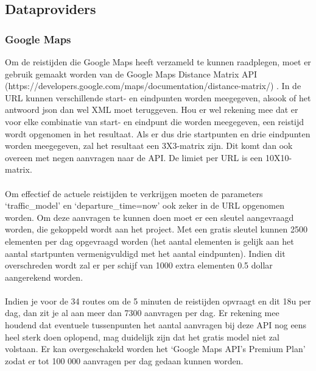 \documentclass[ps,a4paper,oneside]{report}
\begin{document}
\subsection{Dataproviders}
\subsubsection{Google Maps}
Om de reistijden die Google Maps heeft verzameld te kunnen raadplegen, moet er gebruik gemaakt worden van de Google Maps Distance Matrix API \\(https://developers.google.com/maps/documentation/distance-matrix/) . In de URL kunnen verschillende start- en eindpunten worden meegegeven, alsook of het antwoord json dan wel XML moet teruggeven. Hou er wel rekening mee dat er voor elke combinatie van start- en eindpunt die worden meegegeven, een reistijd wordt opgenomen in het resultaat. Als er dus drie startpunten en drie eindpunten worden meegegeven, zal het resultaat een 3X3-matrix zijn. Dit komt dan ook overeen met negen aanvragen naar de API. De limiet per URL is een 10X10-matrix.\\\\
Om effectief de actuele reistijden te verkrijgen moeten de parameters \\‘traffic\_model’ en ‘departure\_time=now’ ook zeker in de URL opgenomen worden. Om deze aanvragen te kunnen doen moet er een sleutel aangevraagd worden, die gekoppeld wordt aan het project. Met een gratis sleutel kunnen 2500 elementen per dag opgevraagd worden (het aantal elementen is gelijk aan het aantal startpunten vermenigvuldigd met het aantal eindpunten). Indien dit overschreden wordt zal er per schijf van 1000 extra elementen 0.5 dollar aangerekend worden.\\\\
Indien je voor de 34 routes om de 5 minuten de reistijden opvraagt en dit 18u per dag, dan zit je al aan meer dan 7300 aanvragen per dag. Er rekening mee houdend dat eventuele tussenpunten het aantal aanvragen bij deze API nog eens heel sterk doen oplopend, mag duidelijk zijn dat het gratis model niet zal volstaan. Er kan overgeschakeld worden het ‘Google Maps API’s Premium Plan’ zodat er tot 100 000 aanvragen per dag gedaan kunnen worden.\\
\end{document}
